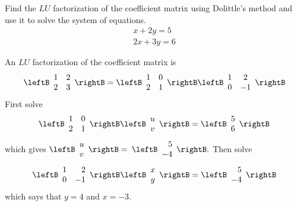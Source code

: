 \begin{enumialphparenastyle}
\begin{ex} Find the $LU$ factorization of the coefficient matrix using Dolittle's
method and use it to solve the system of equations. 
\begin{equation*}
\begin{array}{c}
x+2y=5 \\ 
2x+3y=6
\end{array}
\end{equation*}
\begin{sol}
An $LU$ factorization of the coefficient matrix is
\[
\leftB
\begin{array}{cc}
1 & 2 \\
2 & 3
\end{array}
\rightB =  \leftB
\begin{array}{cc}
1 & 0 \\
2 & 1
\end{array}
\rightB \leftB
\begin{array}{cc}
1 & 2 \\
0 & -1
\end{array}
\rightB
\]
First solve
\[
\leftB
\begin{array}{cc}
1 & 0 \\
2 & 1
\end{array}
\rightB \leftB
\begin{array}{c}
u \\
v
\end{array}
\rightB =\leftB
\begin{array}{c}
5 \\
6
\end{array}
\rightB
\]
which gives $\leftB
\begin{array}{c}
u \\
v
\end{array}
\rightB =$ $\leftB
\begin{array}{r}
5 \\
-4
\end{array}
\rightB .$ Then solve
\[
\leftB
\begin{array}{rr}
1 & 2 \\
0 & -1
\end{array}
\rightB \leftB
\begin{array}{c}
x \\
y
\end{array}
\rightB =\leftB
\begin{array}{r}
5 \\
-4
\end{array}
\rightB
\]
which says that $y=4$ and $x=-3.$
\end{sol}
\end{ex}


\end{enumialphparenastyle}
